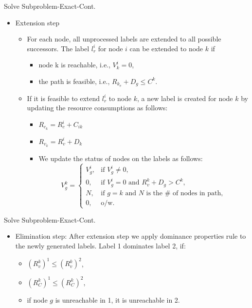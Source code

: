 \documentclass[xcolor=dvipsnames, mathserif, 10pt]{beamer}
\begin{document}
\begin{frame}{Solve Subproblem-Exact-Cont.}
\begin{itemize}
    

 \item Extension step
    \begin{itemize}
        \item For each node, all unprocessed labels are extended to all possible successors. The label $l_r^i$ for node $i$ can be extended to node $k$ if
\begin{itemize}
    \item node k is reachable, i.e., $V^i_k=0$, 
    \item the path is feasible, i.e., $R_k_v+D_g \leq C^k$.
\end{itemize}
        

\item If it is feasible to extend $l_r^i$ to node $k$, a new label is created for node $k$ by updating the resource consumptions as follows:
\begin{itemize}
    \item  $R_c_k = R_c^i + C_{ik}$
    
    \item $R_v_k = R_v^i + D_{k}$
    
    \item We update the status of nodes on the labels as follows:
    \begin{equation*}
  V_g^k=\begin{cases}
    V_g^i, & \text{if $V_g^i \neq 0$},\\
    0, & \text{if $V_g^i = 0$ and $R_v^k + D_g > C^k$},\\
    N, & \text{if $g=k$ and $N$ is the $\#$ of nodes in path},\\
    0, & \text{o/w}.
  \end{cases}
\end{equation*}
  \end{itemize}  
\end{itemize}

\end{itemize}
\end{frame}

\begin{frame}{Solve Subproblem-Exact-Cont.}
\begin{itemize}
    \item Elimination step: After extension step we apply dominance properties rule to the newly generated labels. Label 1 dominates label 2, if:
    \begin{itemize}
        \item $(R_v^k)^1 \leq (R_v^k)^2$,
        \item $(R_C^k)^1 \leq (R_C^k)^2$,
        \item if node $g$ is unreachable in 1, it is unreachable in 2. 
    \end{itemize}
\end{itemize}
\end{frame}
\end{document}
